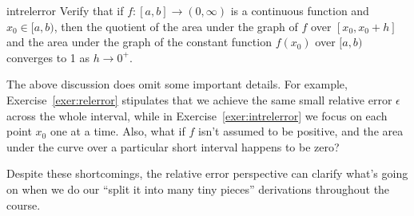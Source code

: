 \documentclass{watsonbook}
\begin{document}
\begin{exercise}{}{intrelerror}
  Verify that if $f:[a,b] \to (0,\infty)$ is a continuous function and
  $x_0 \in [a,b)$, then the quotient of the area under the graph of
  $f$ over $[x_0,x_0+h]$ and the area under the graph of the constant
  function $f(x_0)$ over $[a,b)$ converges to 1 as $h \to 0^+$.
\end{exercise}

The above discussion does omit some important details. For example,
Exercise~\ref{exer:relerror} stipulates that we achieve the same small
relative error $\epsilon$ across the whole interval, while in
Exercise~\ref{exer:intrelerror} we focus on each point $x_0$ one at a
time. Also, what if $f$ isn't assumed to be positive, and the area
under the curve over a particular short interval happens to be zero?

Despite these shortcomings, the relative error perspective can clarify
what's going on when we do our ``split it into many tiny
pieces'' derivations throughout the course. 

\newpage 
\end{document}
